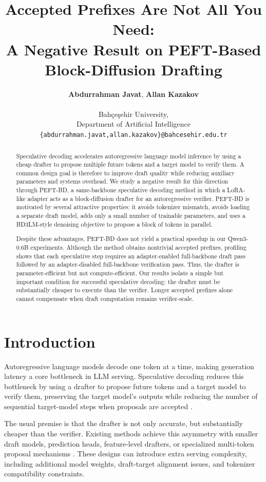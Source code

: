 \documentclass[11pt]{article}
\title{Accepted Prefixes Are Not All You Need:\\ A Negative Result on PEFT-Based Block-Diffusion Drafting}
\author{
 \textbf{Abdurrahman Javat},
 \textbf{Allan Kazakov}
\\
\\
 Bahçeşehir University, \\Department of Artificial Intelligence \\ 
 \texttt{
   \{abdurrahman.javat,allan.kazakov\}@bahcesehir.edu.tr
 }
}
\begin{document}
\maketitle
\begin{abstract}
Speculative decoding accelerates autoregressive language model inference by using a cheap drafter to propose multiple future tokens and a target model to verify them. A common design goal is therefore to improve draft quality while reducing auxiliary parameters and systems overhead. We study a negative result for this direction through PEFT-BD, a same-backbone speculative decoding method in which a LoRA-like adapter acts as a block-diffusion drafter for an autoregressive verifier. PEFT-BD is motivated by several attractive properties: it avoids tokenizer mismatch, avoids loading a separate draft model, adds only a small number of trainable parameters, and uses a BD3LM-style denoising objective to propose a block of tokens in parallel.

Despite these advantages, PEFT-BD does not yield a practical speedup in our Qwen3-0.6B experiments. Although the method obtains nontrivial accepted prefixes, profiling shows that each speculative step requires an adapter-enabled full-backbone draft pass followed by an adapter-disabled full-backbone verification pass. Thus, the drafter is parameter-efficient but not compute-efficient. Our results isolate a simple but important condition for successful speculative decoding: the drafter must be substantially cheaper to execute than the verifier. Longer accepted prefixes alone cannot compensate when draft computation remains verifier-scale.
\end{abstract}


\section{Introduction}

Autoregressive language models decode one token at a time, making generation latency a core bottleneck in LLM serving. Speculative decoding reduces this bottleneck by using a drafter to propose future tokens and a target model to verify them, preserving the target model's outputs while reducing the number of sequential target-model steps when proposals are accepted \citep{leviathan2023fast,chen2023accelerating}.

The usual premise is that the drafter is not only accurate, but substantially cheaper than the verifier. Existing methods achieve this asymmetry with smaller draft models, prediction heads, feature-level drafters, or specialized multi-token proposal mechanisms \citep{eagle,fastmtp,dflash,dart}. These designs can introduce extra serving complexity, including additional model weights, draft-target alignment issues, and tokenizer compatibility constraints.
\end{document}
